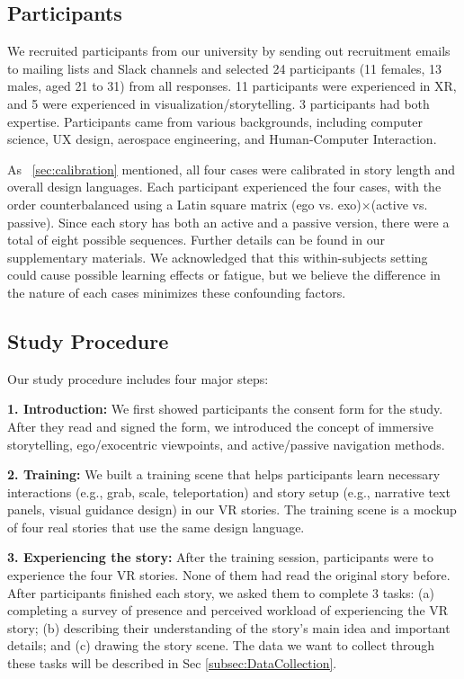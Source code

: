 \subsection{Participants}
We recruited participants from our university by sending out recruitment emails to mailing lists and Slack channels and selected 24 participants (11 females, 13 males, aged 21 to 31) from all responses.
11 participants were experienced in XR, and 5 were experienced in visualization/storytelling. 3 participants had both expertise.
Participants came from various backgrounds, including computer science, UX design, aerospace engineering, and Human-Computer Interaction.

{As ~\autoref{sec:calibration} mentioned, all four cases were calibrated in story length and overall design languages. 
Each participant experienced the four cases, with the order counterbalanced using a Latin square matrix (ego vs. exo)$\times$(active vs. passive).
Since each story has both an active and a passive version, there were a total of eight possible sequences. Further details can be found in our supplementary materials.
We acknowledged that this within-subjects setting could cause possible learning effects or fatigue, but we believe the difference in the nature of each cases minimizes these confounding factors.}

\subsection{Study Procedure}
Our study procedure includes four major steps:

\noindent{}\textbf{1. Introduction:} We first showed participants the consent form for the study. After they read and signed the form, we introduced the concept of immersive storytelling, ego/exocentric viewpoints, and active/passive navigation methods.

\noindent{}\textbf{2. Training:} We built a training scene that helps participants learn necessary interactions (e.g., grab, scale, teleportation) and story setup (e.g., narrative text panels, visual guidance design) in our VR stories. 
The training scene is a mockup of four real stories that use the same design language.

\noindent{}\textbf{3. Experiencing the story:} After the training session, participants were to experience the four VR stories. None of them had read the original story before. After participants finished each story, we asked them to complete 3 tasks: (a) completing a survey of presence and perceived workload of experiencing the VR story; (b) describing their understanding of the story's main idea and important details; and (c) drawing the story scene. The data we want to collect through these tasks will be described in Sec \ref{subsec:DataCollection}.

